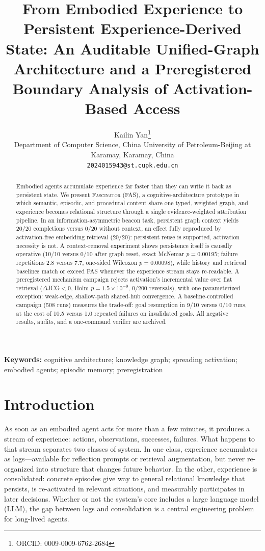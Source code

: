 \documentclass[10pt]{article}
\title{\bfseries From Embodied Experience to Persistent Experience-Derived State: An Auditable Unified-Graph Architecture and a Preregistered Boundary Analysis of Activation-Based Access}
\author{Kailin Yan\thanks{ORCID: 0009-0009-6762-2684}\\
\small Department of Computer Science, China University of Petroleum-Beijing at Karamay, Karamay, China\\
\small \texttt{2024015943@st.cupk.edu.cn}}
\date{}
\begin{document}
\maketitle
\begin{abstract}
Embodied agents accumulate experience far faster than they can write it back as persistent state. We present \textsc{Fascinator} (FAS), a cognitive-architecture prototype in which semantic, episodic, and procedural content share one typed, weighted graph, and experience becomes relational structure through a single evidence-weighted attribution pipeline. In an information-asymmetric beacon task, persistent graph context yields 20/20 completions versus 0/20 without context, an effect fully reproduced by activation-free embedding retrieval (20/20): persistent reuse is supported, activation necessity is not. A context-removal experiment shows persistence itself is causally operative (10/10 versus 0/10 after graph reset, exact McNemar $p{=}0.00195$; failure repetitions 2.8 versus 7.7, one-sided Wilcoxon $p{=}0.00098$), while history and retrieval baselines match or exceed FAS whenever the experience stream stays re-readable. A preregistered mechanism campaign rejects activation's incremental value over flat retrieval ($\Delta$JCG${<}0$, Holm $p{=}1.5\times10^{-9}$, 0/200 reversals), with one parameterized exception: weak-edge, shallow-path shared-hub convergence. A baseline-controlled campaign (508 runs) measures the trade-off: goal resumption in 9/10 versus 0/10 runs, at the cost of 10.5 versus 1.0 repeated failures on invalidated goals. All negative results, audits, and a one-command verifier are archived.
\end{abstract}
\vspace{6pt}
\noindent\textbf{Keywords:} cognitive architecture; knowledge graph; spreading activation; embodied agents; episodic memory; preregistration




\section{Introduction}
\label{sec:intro}

As soon as an embodied agent acts for more than a few minutes, it produces a stream of experience: actions, observations, successes, failures. What happens to that stream separates two classes of system. In one class, experience accumulates as logs---available for reflection prompts or retrieval augmentation, but never re-organized into structure that changes future behavior. In the other, experience is consolidated: concrete episodes give way to general relational knowledge that persists, is re-activated in relevant situations, and measurably participates in later decisions. Whether or not the system's core includes a large language model (LLM), the gap between logs and consolidation is a central engineering problem for long-lived agents.
\end{document}

